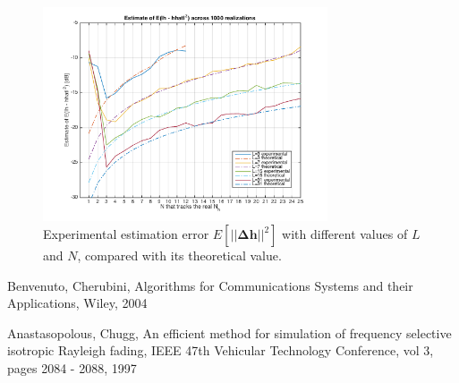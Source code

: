 \documentclass[10pt]{article}
\begin{document}
\begin{figure}[ht] %
	\centering
	\includegraphics[width=0.75\textwidth]{p02_comparetheoreticaldeltah}
	\caption{Experimental estimation error $E[||\mathbf{\Delta h}||^2]$ with different values of $L$ and $N$, compared with its theoretical value.}
    \label{fig:p02_comparetheoreticaldeltah}
\end{figure}


\begin{thebibliography}{10}

Benvenuto, Cherubini, Algorithms for Communications Systems and their Applications, Wiley, 2004

Anastasopolous, Chugg, An efficient method for simulation of frequency selective isotropic Rayleigh fading, IEEE 47th Vehicular Technology Conference, vol 3, pages 2084 - 2088, 1997

\end{thebibliography}
\end{document}
